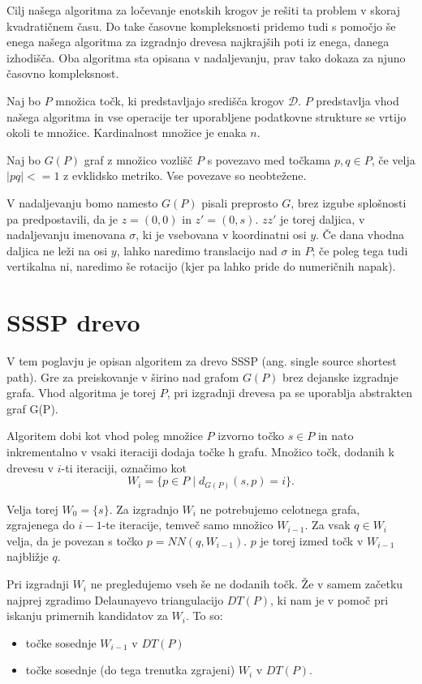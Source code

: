 \documentclass[a4paper, 12pt]{book}
\newcommand{\D}{\ensuremath{\mathcal{D}}}
\begin{document}
Cilj našega algoritma za ločevanje enotskih krogov je rešiti ta problem v skoraj kvadratičnem času. Do take časovne kompleksnosti pridemo tudi s pomočjo še enega našega algoritma za izgradnjo drevesa najkrajših poti iz enega, danega izhodišča. Oba algoritma sta opisana v nadaljevanju, prav tako dokaza za njuno časovno kompleksnost.

Naj bo $P$ množica točk, ki predstavljajo središča krogov $\D$. $P$ predstavlja vhod našega algoritma in vse operacije ter uporabljene podatkovne strukture se vrtijo okoli te množice. Kardinalnost množice je enaka $n$. 

Naj bo $G(P)$ graf z množico vozlišč $P$ s povezavo med točkama $p,q \in P$, če velja $|pq| <= 1$ z evklidsko metriko. Vse povezave so neobtežene.

V nadaljevanju bomo namesto $G(P)$ pisali preprosto $G$, brez izgube splošnosti pa predpostavili, da je $z=(0,0)$ in $z'=(0,s)$. $zz'$ je torej daljica, v nadaljevanju imenovana $\sigma$, ki je vsebovana v koordinatni osi $y$. Če dana vhodna daljica ne leži na osi $y$, lahko naredimo translacijo nad $\sigma$ in $P$; če poleg tega tudi vertikalna ni, naredimo še rotacijo (kjer pa lahko pride do numeričnih napak). 
\section{SSSP drevo}

V tem poglavju je opisan algoritem za drevo SSSP (ang. single source shortest path). Gre za preiskovanje v širino nad grafom $G(P)$ brez dejanske izgradnje grafa. Vhod algoritma je torej $P$, pri izgradnji drevesa pa se uporablja abstrakten graf G(P).

Algoritem dobi kot vhod poleg množice $P$ izvorno točko $s\in P$ in nato inkrementalno v vsaki iteraciji dodaja točke h grafu. Množico točk, dodanih k drevesu v $i$-ti iteraciji, označimo kot
\[	W_i = \{ p\in P \mid d_{G(P)}(s,p) = i\}.
	\]

Velja torej $W_0 = \{s\}$. Za izgradnjo $W_i$ ne potrebujemo celotnega grafa, zgrajenega do $i-1$-te iteracije, temveč samo množico $W_{i-1}$.  Za vsak $q\in W_i$ velja, da je povezan s točko $p = NN(q, W_{i-1})$. $p$ je torej izmed točk v $W_{i-1}$ najbližje $q$.

Pri izgradnji $W_i$ ne pregledujemo vseh še ne dodanih točk. Že v samem začetku najprej zgradimo Delaunayevo triangulacijo $DT(P)$, ki nam je v pomoč pri iskanju primernih kandidatov za $W_i$. To so:

\begin{itemize}
\item točke sosednje $W_{i-1}$ v $DT(P)$
\item točke sosednje (do tega trenutka zgrajeni) $W_i$ v $DT(P)$.
\end{itemize} 
\end{document}
